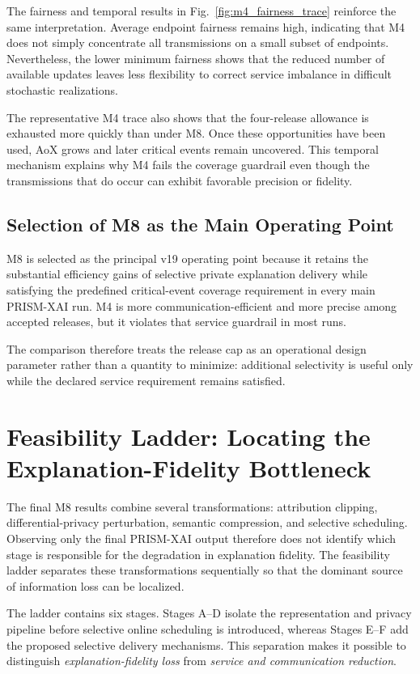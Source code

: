 \documentclass[11pt]{article}
\begin{document}
The fairness and temporal results in Fig.~\ref{fig:m4_fairness_trace} reinforce the same interpretation. Average endpoint fairness remains high, indicating that M4 does not simply concentrate all transmissions on a small subset of endpoints. Nevertheless, the lower minimum fairness shows that the reduced number of available updates leaves less flexibility to correct service imbalance in difficult stochastic realizations.

The representative M4 trace also shows that the four-release allowance is exhausted more quickly than under M8. Once these opportunities have been used, AoX grows and later critical events remain uncovered. This temporal mechanism explains why M4 fails the coverage guardrail even though the transmissions that do occur can exhibit favorable precision or fidelity.

\subsection{Selection of M8 as the Main Operating Point}

M8 is selected as the principal v19 operating point because it retains the substantial efficiency gains of selective private explanation delivery while satisfying the predefined critical-event coverage requirement in every main PRISM-XAI run. M4 is more communication-efficient and more precise among accepted releases, but it violates that service guardrail in most runs.

The comparison therefore treats the release cap as an operational design parameter rather than a quantity to minimize: additional selectivity is useful only while the declared service requirement remains satisfied.

\section{Feasibility Ladder: Locating the Explanation-Fidelity Bottleneck}

The final M8 results combine several transformations: attribution clipping, differential-privacy perturbation, semantic compression, and selective scheduling. Observing only the final PRISM-XAI output therefore does not identify which stage is responsible for the degradation in explanation fidelity. The feasibility ladder separates these transformations sequentially so that the dominant source of information loss can be localized.

The ladder contains six stages. Stages A--D isolate the representation and privacy pipeline before selective online scheduling is introduced, whereas Stages E--F add the proposed selective delivery mechanisms. This separation makes it possible to distinguish \emph{explanation-fidelity loss} from \emph{service and communication reduction}.
\end{document}

